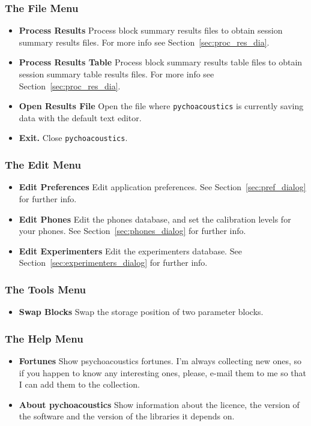 \subsubsection{The File Menu}
\begin{itemize}
\item \textbf{Process Results} Process block summary results files to obtain 
session summary results files. For more info see Section~\ref{sec:proc_res_dia}.
\item \textbf{Process Results Table} Process block summary results table files to obtain 
session summary table results files. For more info see Section~\ref{sec:proc_res_dia}.
\item \textbf{Open Results File} Open the file where \texttt{pychoacoustics} is currently saving data with the default text editor.
\item \textbf{Exit.} Close \texttt{pychoacoustics}.

\end{itemize}

\subsubsection{The Edit Menu}
\begin{itemize}
\item \textbf{Edit Preferences} Edit application preferences. See Section~\ref{sec:pref_dialog} for further info.
\item \textbf{Edit Phones} Edit the phones database, and set the calibration levels for your phones. See Section~\ref{sec:phones_dialog} for further info.
\item \textbf{Edit Experimenters} Edit the experimenters database. See Section~\ref{sec:experimenters_dialog} for further info.
\end{itemize}

\subsubsection{The Tools Menu}
\begin{itemize}
\item \textbf{Swap Blocks} Swap the storage position of two parameter blocks.
\end{itemize}

\subsubsection{The Help Menu}
\begin{itemize}
\item \textbf{Fortunes} Show psychoacoustics fortunes. I'm always collecting new ones, so if you happen to know any interesting ones, please, e-mail them to me so that I can add them to the collection.
\item \textbf{About pychoacoustics} Show information about the licence, the version of the software and the version of the libraries it depends on.
\end{itemize}

